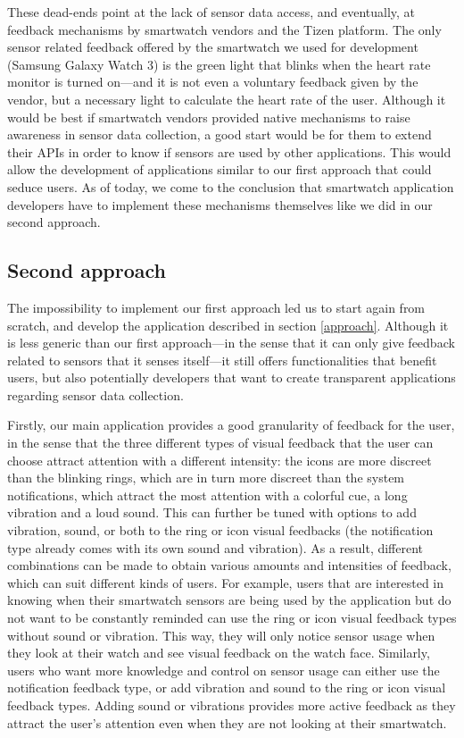 \documentclass[conference, a4paper, 10pt, twocolumn]{IEEEtran}
\begin{document}
These dead-ends point at the lack of sensor data access, and eventually, at feedback mechanisms by smartwatch vendors and the Tizen platform. The only sensor related feedback offered by the smartwatch we used for development (Samsung Galaxy Watch 3) is the green light that blinks when the heart rate monitor is turned on---and it is not even a voluntary feedback given by the vendor, but a necessary light to calculate the heart rate of the user. Although it would be best if smartwatch vendors provided native mechanisms to raise awareness in sensor data collection, a good start would be for them to extend their \acp{API} in order to know if sensors are used by other applications. This would allow the development of applications similar to our first approach that could seduce users. As of today, we come to the conclusion that smartwatch application developers have to implement these mechanisms themselves like we did in our second approach.

\subsection{Second approach}
The impossibility to implement our first approach led us to start again from scratch, and develop the application described in section \ref{approach}. Although it is less generic than our first approach---in the sense that it can only give feedback related to sensors that it senses itself---it still offers functionalities that benefit users, but also potentially developers that want to create transparent applications regarding sensor data collection.

Firstly, our main application provides a good granularity of feedback for the user, in the sense that the three different types of visual feedback that the user can choose attract attention with a different intensity: the icons are more discreet than the blinking rings, which are in turn more discreet than the system notifications, which attract the most attention with a colorful cue, a long vibration and a loud sound. This can further be tuned with options to add vibration, sound, or both to the ring or icon visual feedbacks (the notification type already comes with its own sound and vibration). As a result, different combinations can be made to obtain various amounts and intensities of feedback, which can suit different kinds of users. For example, users that are interested in knowing when their smartwatch sensors are being used by the application but do not want to be constantly reminded can use the ring or icon visual feedback types without sound or vibration. This way, they will only notice sensor usage when they look at their watch and see visual feedback on the watch face. Similarly, users who want more knowledge and control on sensor usage can either use the notification feedback type, or add vibration and sound to the ring or icon visual feedback types. Adding sound or vibrations provides more active feedback as they attract the user's attention even when they are not looking at their smartwatch. 
\end{document}
